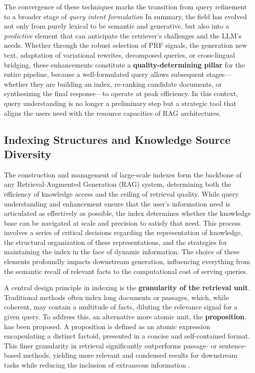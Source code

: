 \documentclass[11pt]{article}
\begin{document}
The convergence of these techniques marks the transition from query refinement to a broader stage of \emph{query intent formulation} In summary, the field has evolved not only from purely lexical to be semantic and generative, but also into a \emph{predictive} element that can anticipate the retriever's challenges and the LLM's needs. Whether through the robust selection of PRF signals, the generation new text, adaptation of variational rewrites, decomposed queries, or cross-lingual bridging, these enhancements constitute a \textbf{quality-determining pillar} for the entire pipeline, because a well-formulated query allows subsequent stages---whether they are building an index, re-ranking candidate documents, or synthesizing the final response---to operate at peak efficiency. In this context, query understanding is no longer a preliminary step but a strategic tool that aligns the users need with the resource capacities of RAG architectures.

\subsection{Indexing Structures and Knowledge Source Diversity}

The construction and management of large-scale indexes form the backbone of any Retrieval-Augmented Generation (RAG) system, determining both the efficiency of knowledge access and the ceiling of retrieval quality. While query understanding and enhancement ensure that the user's information need is articulated as effectively as possible, the index determines whether the knowledge base can be navigated at scale and precision to satisfy that need. This process involves a series of critical decisions regarding the representation of knowledge, the structural organization of these representations, and the strategies for maintaining the index in the face of dynamic information. The choice of these elements profoundly impacts downstream generation, influencing everything from the semantic recall of relevant facts to the computational cost of serving queries.

A central design principle in indexing is the \textbf{granularity of the retrieval unit}. Traditional methods often index long documents or passages, which, while coherent, may contain a multitude of facts, diluting the relevance signal for a given query. To address this, an alternative more atomic unit, the \textbf{proposition}, has been proposed. A proposition is defined as an atomic expression encapsulating a distinct factoid, presented in a concise and self-contained format. This finer granularity in retrieval significantly outperforms passage- or sentence-based methods, yielding more relevant and condensed results for downstream tasks while reducing the inclusion of extraneous information \cite{ref111}.
\end{document}

